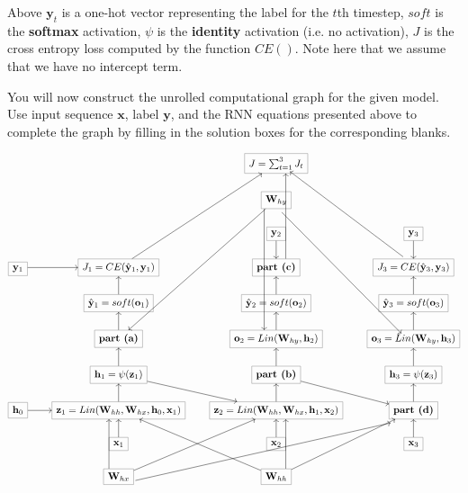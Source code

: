 \documentclass[11pt,addpoints,answers]{exam}
\newcommand{\hv}{\mathbf{h}}
\newcommand{\ov}{\mathbf{o}}
\newcommand{\xv}{\mathbf{x}}
\newcommand{\yv}{\mathbf{y}}
\newcommand{\zv}{\mathbf{z}}
\newcommand{\Wv}{\mathbf{W}}
\begin{document}
\begin{questions}
\begin{parts}
Above $\yv_t$ is a one-hot vector representing the label for the $t$th timestep, $soft$ is the \textbf{softmax} activation, $\psi$ is the \textbf{identity} activation (i.e. no activation), $J$ is the cross entropy loss computed by the function $CE()$. Note here that we assume that we have no intercept term. 

\begin{subparts}

\clearpage
    \subpart[4] You will now construct the unrolled computational graph for the given model.
    Use input sequence $\xv$, label $\yv$, and the RNN equations presented above to complete the graph by filling in the solution boxes for the corresponding blanks.\\

    \begin{EnvUplevel}
    \[\begin{tikzcd}[cells={nodes={draw=gray}}]
	&& {J = \sum_{t=1}^3 J_t} \\
	&& {\Wv_{hy}} \\
	&& {\yv_2} & {\yv_3} \\
	{\yv_1} & {J_1 = CE(\hat{\yv}_{1}, \yv_1)} & {\textbf{part (c)}} & {J_3 = CE(\hat{\yv}_{3}, \yv_3)} \\
	& {\hat{\yv}_1 = soft(\ov_1)} & {\hat{\yv}_2 = soft(\ov_2)} & {\hat{\yv}_3 = soft(\ov_3)} \\
	& {\textbf{part (a)}} & {\ov_2 = Lin(\Wv_{hy}, \hv_2)} & {\ov_3 = Lin(\Wv_{hy}, \hv_3)} \\
	& {\hv_1 = \psi(\zv_1)} & {\textbf{part (b)}} & {\hv_3 = \psi(\zv_3)} \\
	{\hv_0} & {\zv_1 = Lin(\Wv_{hh}, \Wv_{hx},\hv_0,\xv_1)} & {\zv_2 = Lin(\Wv_{hh}, \Wv_{hx},\hv_1,\xv_2)} & {\textbf{part (d)}} \\
	& {\xv_1} & {\xv_2} & {\xv_3} \\
	& {\Wv_{hx}} & {\Wv_{hh}}
	\arrow[from=8-1, to=8-2]
	\arrow[from=9-2, to=8-2]
	\arrow[from=8-2, to=7-2]
	\arrow[from=7-2, to=8-3]
	\arrow[from=7-2, to=6-2]
	\arrow[from=6-2, to=5-2]
	\arrow[from=5-2, to=4-2]
	\arrow[from=4-1, to=4-2]
	\arrow[from=9-3, to=8-3]
	\arrow[from=8-3, to=7-3]
	\arrow[from=7-3, to=6-3]
	\arrow[from=6-3, to=5-3]
	\arrow[from=5-3, to=4-3]
	\arrow[from=3-3, to=4-3]
	\arrow[from=3-4, to=4-4]
	\arrow[from=5-4, to=4-4]
	\arrow[from=6-4, to=5-4]
	\arrow[from=7-4, to=6-4]
	\arrow[from=8-4, to=7-4]
	\arrow[from=7-3, to=8-4]
	\arrow[from=9-4, to=8-4]
	\arrow[shift left=4, from=10-2, to=8-2]
	\arrow[from=10-2, to=8-3]
	\arrow[from=10-3, to=8-2]
	\arrow[shift right=4, from=10-3, to=8-3]
	\arrow[from=10-3, to=8-4]
	\arrow[shift right=2, from=2-3, to=6-4]
	\arrow[from=2-3, to=6-2]
	\arrow[shift right=5, from=2-3, to=6-3]
	\arrow[from=4-2, to=1-3]
	\arrow[shift right=4, from=4-3, to=1-3]
	\arrow[shift right, from=4-4, to=1-3]
	\arrow[shift right=3, from=10-2, to=8-4]
\end{tikzcd}\]
    \end{EnvUplevel}


\end{subparts}
\end{parts}
\end{questions}
\end{document}
